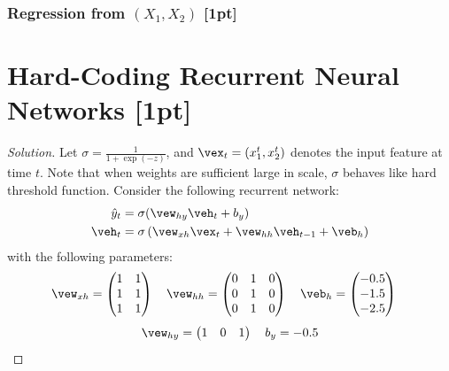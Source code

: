 \documentclass{article}
\begin{document}
	\subsubsection{Regression from $(X_1, X_2)$ [1pt]}
	
	\section{Hard-Coding Recurrent Neural Networks [1pt]}
	\begin{proof}[Solution]
		Let $\sigma = \frac{1}{1 + \exp(-z)}$, and $\vex_t = (x_1^t, x_2^t)$ denotes the input feature at time $t$. Note that when weights are sufficient large in scale, $\sigma$ behaves like hard threshold function.
		Consider the following recurrent network:
		\begin{align}
			\hat{y}_t &= \sigma(\vew_{hy} \veh_t + b_y)\\
			\veh_t &= \sigma\left(
				\vew_{xh} \vex_t
				+ \vew_{hh} \veh_{t-1}
				+ \veb_h
			\right)
		\end{align}
		with the following parameters:
		\begin{align}
			\vew_{xh} &= 
			\begin{pmatrix}
				 1 & 1 \\
				 1 & 1 \\
				 1 & 1
			\end{pmatrix}
			\quad
			\vew_{hh} = 
			\begin{pmatrix}
				0 & 1 & 0 \\
				0 & 1 & 0 \\
				0 & 1 & 0
			\end{pmatrix}
			\quad
			\veb_h = \begin{pmatrix}
				-0.5 \\ -1.5 \\ -2.5
			\end{pmatrix}
		\end{align}
		\begin{align}
			\vew_{hy} = 
			\begin{pmatrix}
				1 & 0 & 1
			\end{pmatrix}
			\quad
			b_y = -0.5
		\end{align}
		

\end{proof}
\end{document}
